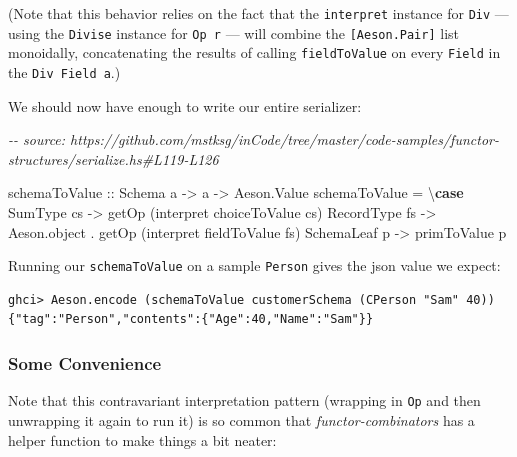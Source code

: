 \documentclass[]{article}
\newenvironment{Shaded}{}{}
\newcommand{\CommentTok}[1]{\textcolor[rgb]{0.38,0.63,0.69}{\textit{#1}}}
\newcommand{\DataTypeTok}[1]{\textcolor[rgb]{0.56,0.13,0.00}{#1}}
\newcommand{\KeywordTok}[1]{\textcolor[rgb]{0.00,0.44,0.13}{\textbf{#1}}}
\newcommand{\NormalTok}[1]{#1}
\newcommand{\OperatorTok}[1]{\textcolor[rgb]{0.40,0.40,0.40}{#1}}
\newcommand{\OtherTok}[1]{\textcolor[rgb]{0.00,0.44,0.13}{#1}}
\begin{document}
(Note that this behavior relies on the fact that the \texttt{interpret} instance
for \texttt{Div} --- using the \texttt{Divise} instance for \texttt{Op\ r} ---
will combine the \texttt{{[}Aeson.Pair{]}} list monoidally, concatenating the
results of calling \texttt{fieldToValue} on every \texttt{Field} in the
\texttt{Div\ Field\ a}.)

We should now have enough to write our entire serializer:

\begin{Shaded}
\begin{Highlighting}[]
\CommentTok{{-}{-} source: https://github.com/mstksg/inCode/tree/master/code{-}samples/functor{-}structures/serialize.hs\#L119{-}L126}

\NormalTok{schemaToValue}
\OtherTok{    ::} \DataTypeTok{Schema}\NormalTok{ a}
    \OtherTok{{-}\textgreater{}}\NormalTok{ a}
    \OtherTok{{-}\textgreater{}} \DataTypeTok{Aeson.Value}
\NormalTok{schemaToValue }\OtherTok{=}\NormalTok{ \textbackslash{}}\KeywordTok{case}
    \DataTypeTok{SumType}\NormalTok{    cs }\OtherTok{{-}\textgreater{}}\NormalTok{ getOp (interpret choiceToValue cs)}
    \DataTypeTok{RecordType}\NormalTok{ fs }\OtherTok{{-}\textgreater{}}\NormalTok{ Aeson.object }\OperatorTok{.}\NormalTok{ getOp (interpret fieldToValue fs)}
    \DataTypeTok{SchemaLeaf}\NormalTok{ p  }\OtherTok{{-}\textgreater{}}\NormalTok{ primToValue p}
\end{Highlighting}
\end{Shaded}

Running our \texttt{schemaToValue} on a sample \texttt{Person} gives the json
value we expect:

\begin{verbatim}
ghci> Aeson.encode (schemaToValue customerSchema (CPerson "Sam" 40))
{"tag":"Person","contents":{"Age":40,"Name":"Sam"}}
\end{verbatim}

\subsubsection{Some Convenience}\label{some-convenience}

Note that this contravariant interpretation pattern (wrapping in \texttt{Op} and
then unwrapping it again to run it) is so common that \emph{functor-combinators}
has a helper function to make things a bit neater:
\end{document}
